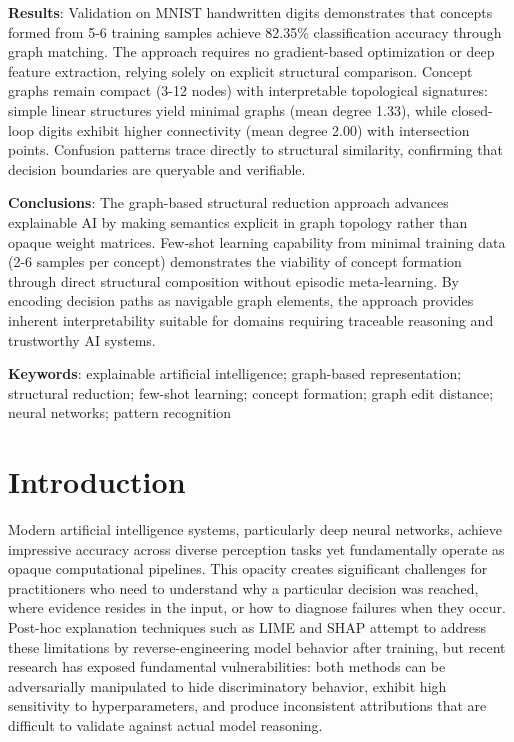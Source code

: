 \documentclass[a4paper,10pt]{article}
\begin{document}
\textbf{Results}: Validation on MNIST handwritten digits demonstrates that concepts formed from 5-6 training samples achieve 82.35\% classification accuracy through graph matching. The approach requires no gradient-based optimization or deep feature extraction, relying solely on explicit structural comparison. Concept graphs remain compact (3-12 nodes) with interpretable topological signatures: simple linear structures yield minimal graphs (mean degree 1.33), while closed-loop digits exhibit higher connectivity (mean degree 2.00) with intersection points. Confusion patterns trace directly to structural similarity, confirming that decision boundaries are queryable and verifiable.

\textbf{Conclusions}: The graph-based structural reduction approach advances explainable AI by making semantics explicit in graph topology rather than opaque weight matrices. Few-shot learning capability from minimal training data (2-6 samples per concept) demonstrates the viability of concept formation through direct structural composition without episodic meta-learning. By encoding decision paths as navigable graph elements, the approach provides inherent interpretability suitable for domains requiring traceable reasoning and trustworthy AI systems.

\textbf{Keywords}: explainable artificial intelligence; graph-based representation; structural reduction; few-shot learning; concept formation; graph edit distance; neural networks; pattern recognition

\vspace{0.5cm}

\section{Introduction}

Modern artificial intelligence systems, particularly deep neural networks, achieve impressive accuracy across diverse perception tasks yet fundamentally operate as opaque computational pipelines. This opacity creates significant challenges for practitioners who need to understand why a particular decision was reached, where evidence resides in the input, or how to diagnose failures when they occur. Post-hoc explanation techniques such as LIME and SHAP attempt to address these limitations by reverse-engineering model behavior after training, but recent research has exposed fundamental vulnerabilities: both methods can be adversarially manipulated to hide discriminatory behavior, exhibit high sensitivity to hyperparameters, and produce inconsistent attributions that are difficult to validate against actual model reasoning.
\end{document}
